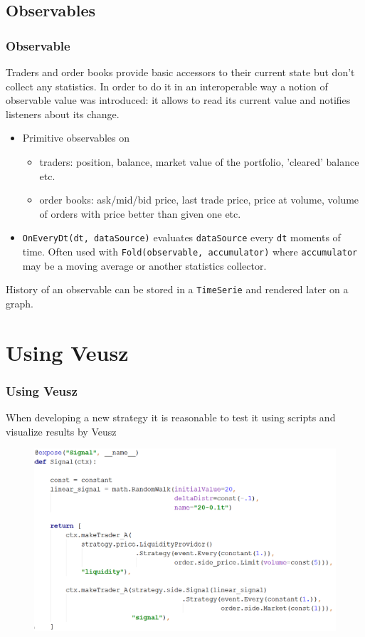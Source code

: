 \documentclass{beamer}
\begin{document}
\subsection{Observables}
\begin{frame}
\frametitle{Observable}
Traders and order books provide basic accessors to their current state but don't collect any statistics. In order to do it in an interoperable way a notion of observable value was introduced: it allows to read its current value and notifies listeners about its change.
\begin{itemize}
    \item Primitive observables on
    \begin{itemize}
      \item traders: position, balance, market value of the portfolio, 'cleared' balance etc.
      \item order books: ask/mid/bid price, last trade price, price at volume, volume of orders with price better than given one etc.
    \end{itemize}
    \item \texttt{OnEveryDt(dt, dataSource)} evaluates \texttt{dataSource} every \texttt{dt} moments of time. Often used with \texttt{Fold(observable, accumulator)} where \texttt{accumulator} may be a moving average or another statistics collector.
\end{itemize}
History of an observable can be stored in a \texttt{TimeSerie} and rendered later on a graph.
\end{frame}

\section{Using Veusz}
\begin{frame}
\frametitle{Using Veusz}
When developing a new strategy it is reasonable to test it using scripts and visualize results by Veusz
\begin{figure}[htbp]
\centering
\includegraphics[width=1\linewidth]{using_veusz_code.png}
\end{figure}
\end{frame}
\end{document}

